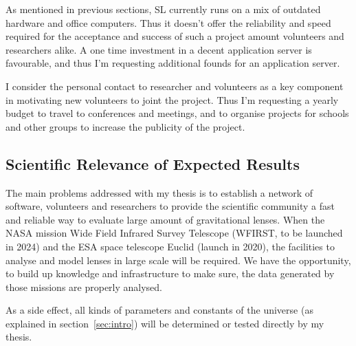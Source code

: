 \documentclass[11pt]{article}
\begin{document}
As mentioned in previous sections, SL currently runs on a mix of outdated hardware and office computers.
Thus it doesn't offer the reliability and speed required for the acceptance and success of such a project amount volunteers and researchers alike.
A one time investment in a decent application server is favourable, and thus I'm requesting additional founds for an application server.

I consider the personal contact to researcher and volunteers as a key component in motivating new volunteers to joint the project.
Thus I'm requesting a yearly budget to travel to conferences and meetings, and to organise projects for schools and other groups to increase the publicity of the project.



\subsection{Scientific Relevance of Expected Results}

The main problems addressed with my thesis is to establish a network of software, volunteers and researchers to provide the scientific community a fast and reliable way to evaluate large amount of gravitational lenses.
When the NASA mission Wide Field Infrared Survey Telescope (WFIRST, to be launched in 2024) and the ESA space telescope Euclid (launch in 2020), the facilities to analyse and model lenses in large scale will be required.
We have the opportunity, to build up knowledge and infrastructure to make sure, the data generated by those missions are properly analysed.



As a side effect, all kinds of parameters and constants of the universe (as explained in section~\ref{sec:intro}) will be determined or tested directly by my thesis.





\end{document}
